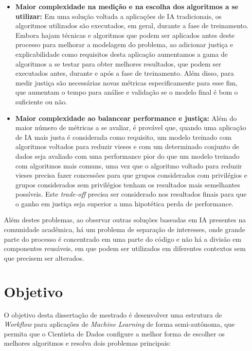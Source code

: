 \documentclass[portugues]{ic-tese}
\begin{document}
\begin{itemize}
\item \textbf{Maior complexidade na medição e na escolha dos algoritmos a se utilizar:} Em uma solução voltada a aplicações de IA tradicionais, os algoritmos utilizados são executados, em geral, durante a fase de treinamento. Embora hajam técnicas e algoritmos que podem ser aplicados antes deste processo para melhorar a modelagem do problema, ao adicionar justiça e explicabilidade como requisitos desta aplicação aumentamos a gama de algoritmos a se testar para obter melhores resultados, que podem ser executados antes, durante e após a fase de treinamento. Além disso, para medir justiça são necessárias novas métricas especificamente para esse fim, que aumentam o tempo para análise e validação se o modelo final é bom o suficiente ou não.
\item \textbf{Maior complexidade ao balancear performance e justiça:} Além do maior número de métricas a se avaliar, é provável que, quando uma aplicação de IA mais justa é considerada como requisito, um modelo treinado com algoritmos voltados para reduzir vieses e com um determinado conjunto de dados seja avaliado com uma performance pior do que um modelo treinado com algoritmos mais comuns, uma vez que o algoritmo voltado para reduzir vieses precisa fazer concessões para que grupos considerados com privilégios e grupos considerados sem privilégios tenham os resultados mais semelhantes possíveis. Este \textit{trade-off} precisa ser considerado nos resultados finais para que o ganho em justiça seja superior a uma hipotética perda de performance.
\end{itemize}

Além destes problemas, ao observar outras soluções baseadas em IA presentes na comunidade acadêmica, há um problema de separação de interesses, onde grande parte do processo é concentrado em uma parte do código e não há a divisão em componentes reusáveis, em que podem ser utilizados em diferentes contextos sem que precisem ser alterados.

\section{Objetivo}

O objetivo desta dissertação de mestrado é desenvolver uma estrutura de \textit{Workflow} para aplicações de \textit{Machine Learning} de forma semi-autônoma, que permita que o Cientista de Dados configure a melhor forma de escolher os melhores algoritmos e resolva dois problemas principais:
\end{document}
